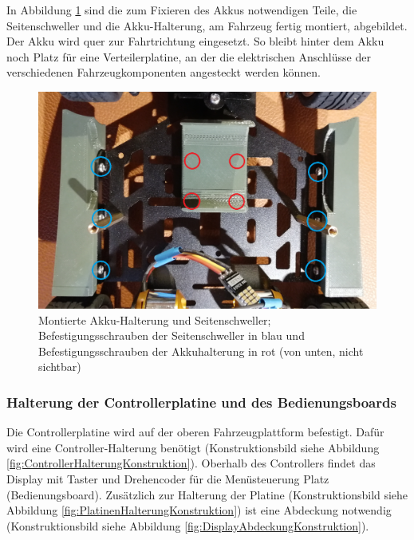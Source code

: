 In Abbildung \ref{fig:SchwellerAkkuHalterungMontage} sind die zum Fixieren des Akkus notwendigen Teile, die Seitenschweller und die Akku-Halterung, am Fahrzeug fertig montiert, abgebildet. Der Akku wird quer zur Fahrtrichtung eingesetzt. So bleibt hinter dem Akku noch Platz für eine Verteilerplatine, an der die elektrischen Anschlüsse der verschiedenen Fahrzeugkomponenten angesteckt werden können.

\begin{figure}[H] %
\includegraphics[width=.7\textwidth]{sec2/images/3DAnbaukomponenten/Montagebilder/SchwellerAkkuHalterungMontage} 
\centering
\captionsetup{width=.95\textwidth}
\caption[Montierte Akku-Halterung und Seitenschweller]{Montierte Akku-Halterung und Seitenschweller; Befestigungsschrauben der Seitenschweller in blau und Befestigungsschrauben der Akkuhalterung in rot (von unten, nicht sichtbar)}\centering
\label{fig:SchwellerAkkuHalterungMontage}
\end{figure}

\newpage

\subsubsection{Halterung der Controllerplatine und des Bedienungsboards}\label{Sec2Sub2SubSub3}

Die Controllerplatine wird auf der oberen Fahrzeugplattform befestigt. Dafür wird eine Controller-Halterung benötigt (Konstruktionsbild siehe Abbildung \ref{fig:ControllerHalterungKonstruktion}). Oberhalb des Controllers findet das Display mit Taster und Drehencoder für die Menüsteuerung Platz (Bedienungsboard). Zusätzlich zur Halterung der Platine (Konstruktionsbild siehe Abbildung \ref{fig:PlatinenHalterungKonstruktion}) ist eine Abdeckung notwendig (Konstruktionsbild siehe Abbildung \ref{fig:DisplayAbdeckungKonstruktion}).

